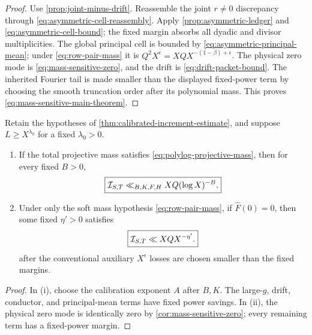\begin{proof}
Use \cref{prop:joint-minus-drift}.  Reassemble the joint \(r\ne0\)
discrepancy through \eqref{eq:asymmetric-cell-reassembly}.  Apply
\cref{prop:asymmetric-ledger} and
\eqref{eq:asymmetric-cell-bound}; the fixed margin absorbs all dyadic
and divisor multiplicities.  The global principal cell is bounded by
\eqref{eq:asymmetric-principal-mean}; under
\eqref{eq:row-pair-mass} it is
\(Q^2X^\epsilon=XQX^{-(1-\beta)+\epsilon}\).  The physical zero mode
is \eqref{eq:mass-sensitive-zero}, and the drift is
\eqref{eq:drift-packet-bound}.  The inherited Fourier tail is made
smaller than the displayed fixed-power term by choosing the smooth
truncation order after its polynomial mass.  This proves
\eqref{eq:mass-sensitive-main-theorem}.
\end{proof}

\begin{corollary}
\label{cor:two-closure-regimes}
Retain the hypotheses of
\cref{thm:calibrated-increment-estimate}, and suppose
\(L\ge X^{\lambda_0}\) for a fixed \(\lambda_0>0\).
\begin{enumerate}[label=\textup{(\roman*)}]
 \item If the total projective mass satisfies
 \eqref{eq:polylog-projective-mass}, then for every fixed \(B>0\),
 \begin{equation}
  \boxed{\mathcal I_{S,T}\ll_{B,K,F,H}XQ(\log X)^{-B}.}
  \label{eq:polylog-full-closure}
 \end{equation}
 \item Under only the soft mass hypothesis
 \eqref{eq:row-pair-mass}, if \(\widehat F(0)=0\), then some fixed
 \(\eta'>0\) satisfies
 \begin{equation}
  \boxed{\mathcal I_{S,T}\ll XQX^{-\eta'}.}
  \label{eq:mean-zero-full-closure}
 \end{equation}
 after the conventional auxiliary \(X^\epsilon\) losses are chosen
 smaller than the fixed margins.
\end{enumerate}
\end{corollary}

\begin{proof}
In (i), choose the calibration exponent \(A\) after \(B,K\).  The
large-\(g\), drift, conductor, and principal-mean terms have fixed
power savings.  In (ii), the physical zero mode is identically zero by
\cref{cor:mass-sensitive-zero}; every remaining term has a fixed-power
margin.
\end{proof}

